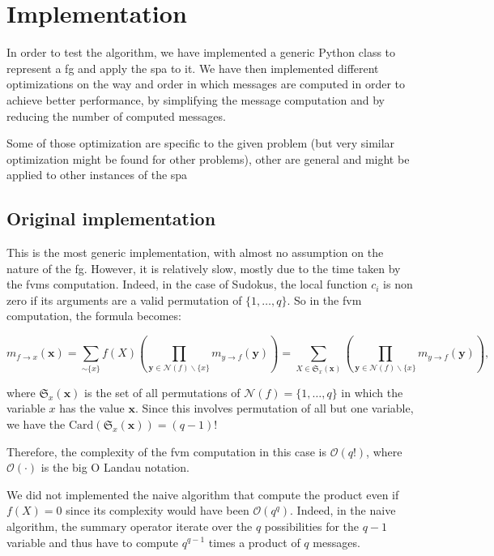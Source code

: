 \documentclass[a4paper,11pt]{report}
\newcommand{\bigO}[1]{\mathcal O\left( #1 \right)}
\newcommand{\set}[1]{\{#1\}}
\newcommand{\parens}[1]{\left( #1 \right)}
\begin{document}
\section{Implementation}

In order to test the algorithm, we have implemented a generic Python class to represent a \ac{fg} and apply the \ac{spa} to it. We have then implemented different optimizations on the way and order in which messages are computed in order to achieve better performance, by simplifying the message computation and by reducing the number of computed messages.

Some of those optimization are specific to the given problem (but very similar optimization might be found for other problems), other are general and might be applied to other instances of the \ac{spa}

\subsection{Original implementation}
\label{sec:orig}

This is the most generic implementation, with almost no assumption on the nature of the \ac{fg}. However, it is relatively slow, mostly due to the time taken by the \acp{fvm} computation. Indeed, in the case of Sudokus, the local function $c_i$ is non zero if its arguments are a valid permutation of $\set{1,\dots,q}$. So in the \ac{fvm} computation, the formula becomes:

\begin{equation}
m_{f \to x} (\mathbf{x}) = \sum_{\sim\set{x}} f(X) \parens{ \prod_{\mathbf{y}\in \mathcal{N}(f)\backslash\set{x}} m_{y \to f} (\mathbf{y}) } = \sum_{X \in \mathfrak{S}_x(\mathbf{x})} \parens{ \prod_{\mathbf{y}\in \mathcal{N}(f)\backslash\set{x}} m_{y \to f} (\mathbf{y}) },
\end{equation}

where $\mathfrak{S}_x(\mathbf{x})$ is the set of all permutations of $\mathcal{N}(f) = \set{1,\dots,q}$ in which the variable $x$ has the value $\mathbf{x}$. Since this involves permutation of all but one variable, we have the $\mathrm{Card}(\mathfrak{S}_x(\mathbf{x})) = (q-1)!$

Therefore, the complexity of the \ac{fvm} computation in this case is $\bigO{q!}$, where $\bigO{\cdot}$ is the big O Landau notation.

We did not implemented the naive algorithm that compute the product even if $f(X) = 0$ since its complexity would have been $\bigO{q^q}$. Indeed, in the naive algorithm, the summary operator iterate over the $q$ possibilities for the $q-1$ variable and thus have to compute $q^{q-1}$ times a product of $q$ messages.
\end{document}
